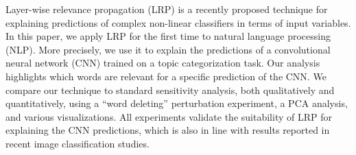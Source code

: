 Layer-wise relevance propagation (LRP) is a recently proposed technique for explaining predictions of complex non-linear classifiers in terms of input variables. In this paper, we apply LRP for the first time to natural language processing (NLP). More precisely, we use it to explain the predictions of a convolutional neural network (CNN) trained on a topic categorization task. Our analysis highlights which words are relevant for a specific prediction of the CNN. We compare our technique to standard sensitivity analysis, both qualitatively and quantitatively, using a ``word deleting'' perturbation experiment, a PCA analysis, and various visualizations. All experiments validate the suitability of LRP for explaining the CNN predictions, which is also in line with results reported in recent image classification studies.
